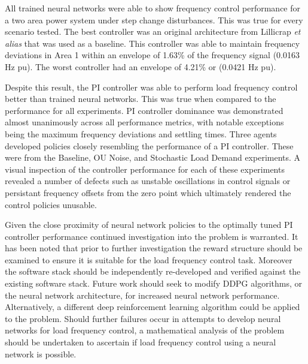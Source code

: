 All trained neural networks were able to show frequency control performance for a two area power system under step change disturbances. This was true for every scenario tested. The best controller was an original architecture from Lillicrap \textit{et alias} that was used as a baseline. This controller was able to maintain frequency deviations in Area 1 within an envelope of 1.63\% of the frequency signal (0.0163 Hz pu). The worst controller had an envelope of 4.21\% or (0.0421 Hz pu).

Despite this result, the PI controller was able to perform load frequency control better than trained neural networks. This was true when compared to the performance for all experiments. PI controller dominance was demonstrated almost unanimously across all performance metrics, with notable exceptions being the maximum frequency deviations and settling times. Three agents developed policies closely resembling the performance of a PI controller. These were from the Baseline, OU Noise, and Stochastic Load Demand experiments. A visual inspection of the controller performance for each of these experiments revealed a number of defects such as unstable oscillations in control signals or persistant frequency offsets from the zero point which ultimately rendered the control policies unusable.

Given the close proximity of neural network policies to the optimally tuned PI controller performance continued investigation into the problem is warranted. It has been noted that prior to further investigation the reward structure should be examined to ensure it is suitable for the load frequency control task. Moreover the software stack should be independently re-developed and verified against the existing software stack. Future work should seek to modify DDPG algorithms, or the neural network architecture, for increased neural network performance. Alternatively, a different deep reinforcement learning algorithm could be applied to the problem. Should further failures occur in attempts to develop neural networks for load frequency control, a mathematical analysis of the problem should be undertaken to ascertain if load frequency control using a neural network is possible.